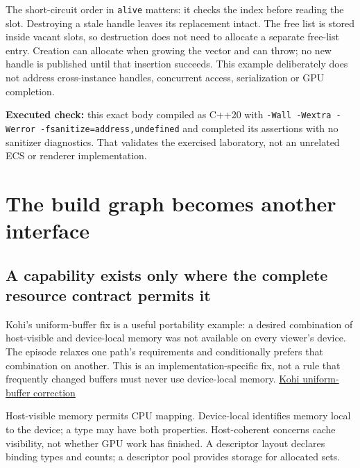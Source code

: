 The short-circuit order in \texttt{alive} matters: it checks the index before reading the slot. Destroying a stale handle leaves its replacement intact. The free list is stored inside vacant slots, so destruction does not need to allocate a separate free-list entry. Creation can allocate when growing the vector and can throw; no new handle is published until that insertion succeeds. This example deliberately does not address cross-instance handles, concurrent access, serialization or GPU completion.

\textbf{Executed check:} this exact body compiled as C++20 with \texttt{-Wall\ -Wextra\ -Werror\ -fsanitize=address,undefined} and completed its assertions with no sanitizer diagnostics. That validates the exercised laboratory, not an unrelated ECS or renderer implementation.

\section{The build graph becomes another interface}\label{05-engine-i-ch008-the-build-graph-becomes-another-interface}

\hypertarget{05-engine-i-ch008-the-build-graph-becomes-another-interface}{}

\subsection{A capability exists only where the complete resource contract permits it}\label{05-engine-i-ch008-a-capability-exists-only-where-the-complete-resource-contract-permits-it}

\hypertarget{05-engine-i-ch008-a-capability-exists-only-where-the-complete-resource-contract-permits-it}{}

Kohi's uniform-buffer fix is a useful portability example: a desired combination of host-visible and device-local memory was not available on every viewer's device. The episode relaxes one path's requirements and conditionally prefers that combination on another. This is an implementation-specific fix, not a rule that frequently changed buffers must never use device-local memory. \href{https://www.youtube.com/watch?v=aD6fZ7tQSAY}{Kohi uniform-buffer correction}

Host-visible memory permits CPU mapping. Device-local identifies memory local to the device; a type may have both properties. Host-coherent concerns cache visibility, not whether GPU work has finished. A descriptor layout declares binding types and counts; a descriptor pool provides storage for allocated sets.


